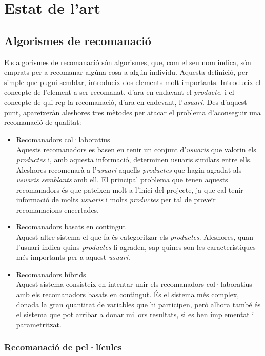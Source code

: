 \chapter{Estat de l'art}

\section{Algorismes de recomanació}

Els algorismes de recomanació són algorismes, que, com el seu nom indica, són emprats per a recomanar algúna cosa a algún individu. Aquesta definició, per simple que pugui semblar, introdueix dos elements molt importants. Introdueix el concepte de l'element a ser recomanat, d'ara en endavant el \emph{producte}, i el concepte de qui rep la recomanació, d'ara en endevant, l'\emph{usuari}. Des d'aquest punt, apareixeràn aleshores tres mètodes per atacar el problema d'aconseguir una recomanació de qualitat:

\begin{itemize}
	\item Recomanadors col·laboratius \\
		Aquests recomanadors es basen en tenir un conjunt d'\emph{usuaris} que valorin els \emph{productes} i, amb aquesta informació, determinen usuaris similars entre ells. Aleshores recomenarà a l'\emph{usuari} aquells \emph{productes} que hagin agradat als \emph{usuaris semblants} amb ell. El principal problema que tenen aquests recomanadors és que pateixen molt a l'inici del projecte, ja que cal tenir informació de molts \emph{usuaris} i molts \emph{productes} per tal de proveïr recomanacions encertades.
	\item Recomanadors basats en contingut \\
		Aquest altre sistema el que fa és categoritzar els \emph{productes}. Aleshores, quan l'usuari indica quins \emph{productes} li agraden, sap quines son les característiques més importants per a aquest \emph{usuari}.
	\item Recomanadors híbrids \\
		Aquest sistema consisteix en intentar unir els recomanadors col·laboratius amb els recomanadors basats en contingut. És el sistema més complex, donada la gran quantitat de variables que hi participen, però alhora també és el sistema que pot arribar a donar millors resultats, si es ben implementat i parametritzat.
\end{itemize}

\subsection{Recomanació de pel·lícules}

